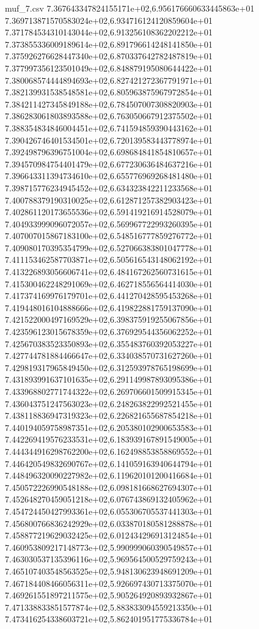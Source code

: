 \begin{filecontents*}{muf_7.csv}
7.367643347824155171e+02,6.956176660633445863e+01
7.369713871570583024e+02,6.934716124120859604e+01
7.371784534310143044e+02,6.913256108362202212e+01
7.373855336009189614e+02,6.891796614248141850e+01
7.375926276628447340e+02,6.870337642782487819e+01
7.377997356123501049e+02,6.848879195080644422e+01
7.380068574444894693e+02,6.827421272367791971e+01
7.382139931538548581e+02,6.805963875967972854e+01
7.384211427345849188e+02,6.784507007308820903e+01
7.386283061803893588e+02,6.763050667912375502e+01
7.388354834846004451e+02,6.741594859390443162e+01
7.390426746401534501e+02,6.720139583443778974e+01
7.392498796396751004e+02,6.698684841854810657e+01
7.394570984754401479e+02,6.677230636484637216e+01
7.396643311394734610e+02,6.655776969268481480e+01
7.398715776234945452e+02,6.634323842211233568e+01
7.400788379190310025e+02,6.612871257382903423e+01
7.402861120173655536e+02,6.591419216914528079e+01
7.404933999096072057e+02,6.569967722993260395e+01
7.407007015867183100e+02,6.548516777859276772e+01
7.409080170395354799e+02,6.527066383801047778e+01
7.411153462587703871e+02,6.505616543148062192e+01
7.413226893056606741e+02,6.484167262560731615e+01
7.415300462248291069e+02,6.462718556564414030e+01
7.417374169976179701e+02,6.441270428595453268e+01
7.419448016104888666e+02,6.419822881759137090e+01
7.421522000497169529e+02,6.398375919255067856e+01
7.423596123015678359e+02,6.376929544356062252e+01
7.425670383523350893e+02,6.355483760392053227e+01
7.427744781884466647e+02,6.334038570731627260e+01
7.429819317965849450e+02,6.312593978765198699e+01
7.431893991637101635e+02,6.291149987893095386e+01
7.433968802771744322e+02,6.269706601509915345e+01
7.436043751247563023e+02,6.248263822992521455e+01
7.438118836947319323e+02,6.226821655687854218e+01
7.440194059758987351e+02,6.205380102900653583e+01
7.442269419576233531e+02,6.183939167891549005e+01
7.444344916298762200e+02,6.162498853858869552e+01
7.446420549832690767e+02,6.141059163940644794e+01
7.448496320090227982e+02,6.119620101200416684e+01
7.450572226990548188e+02,6.098181668627694307e+01
7.452648270459051218e+02,6.076743869132405962e+01
7.454724450427993361e+02,6.055306705537441303e+01
7.456800766836242929e+02,6.033870180581288878e+01
7.458877219629032425e+02,6.012434296913124854e+01
7.460953809217148773e+02,5.990999060390549857e+01
7.463030537135396116e+02,5.969564500529759243e+01
7.465107403548563525e+02,5.948130623948691209e+01
7.467184408466056311e+02,5.926697430713375070e+01
7.469261551897211575e+02,5.905264920893932867e+01
7.471338833851577874e+02,5.883833094559213350e+01
7.473416254338603721e+02,5.862401951775336784e+01

\end{filecontents*}
